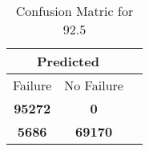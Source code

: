 \begin{table}[] 
\caption{Confusion Matric for 92.5} 
\label{Table: Prediction Accuracy-DMD92.5OnlySunEKF-ignoreReflectionperfectNoFailurePrediction-Reflection} 
\centering 
\begin{tabular} 
 {@{}ccc@{}} 
\toprule 
\multicolumn{2}{c}{\textbf{Predicted}}
 \\ \midrule 
\multicolumn{1}{|c|}{Failure} & 
\multicolumn{1}{c|}{No Failure}
 \\ \midrule 
\multicolumn{1}{|c|}{\color{green}\textbf{95272}} & 
\multicolumn{1}{c|}{\color{red}\textbf{0}}
 \\ \midrule 
\multicolumn{1}{|c|}{\color{red}\textbf{5686}} & 
\multicolumn{1}{c|}{\color{green}\textbf{69170}}
 \\ \bottomrule 
\end{tabular} 
\end{table} 
